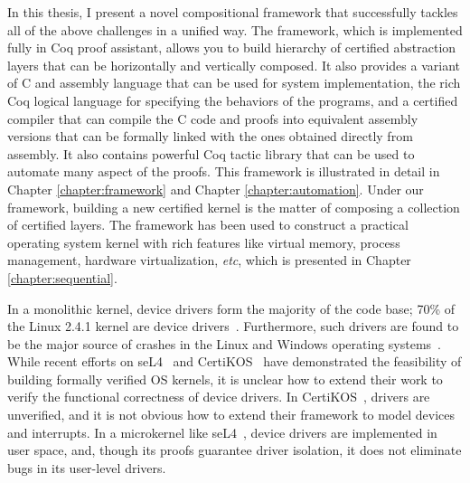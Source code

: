 In this thesis, I present a novel compositional  framework that successfully
tackles all of the above challenges in a unified way. The framework,
which is implemented fully in Coq proof assistant, allows
you to build hierarchy of certified abstraction layers that can be horizontally
and vertically composed. It also provides a variant of C and assembly language
that can be used for system implementation, the rich Coq logical language
for specifying the behaviors of the programs, and a certified compiler that can compile
the C code and proofs into equivalent assembly versions that can be formally linked
with the ones obtained directly from assembly. It also contains powerful
Coq tactic library that can be used to automate many aspect of the proofs.
This framework is illustrated in
detail in Chapter \ref{chapter:framework} and Chapter \ref{chapter:automation}.
Under our framework, building a new certified kernel is the matter of
composing a collection of certified layers. The framework has been used to
construct a practical operating system kernel with rich features like virtual
memory, process management, hardware virtualization, {\it etc}, which is
presented in Chapter \ref{chapter:sequential}.

In a monolithic kernel, device drivers
form the majority of the code base; 70\% of the Linux 2.4.1 kernel are
device drivers~\cite{Chou:2001}. Furthermore, such drivers are found
to be the major source of crashes in the Linux and Windows operating
systems~\cite{Chou:2001,Ball:2006,Ganapathi:2006}. While recent
efforts on seL4~\cite{klein14} and CertiKOS~\cite{dscal15} have
demonstrated the feasibility of building formally verified OS kernels,
it is unclear how to extend their work to verify the functional
correctness of device drivers. In CertiKOS~\cite{dscal15}, drivers are
unverified, and it is not obvious how to extend their framework to
model devices and interrupts. In a microkernel like
seL4~\cite{klein14}, device drivers are implemented in user space,
and, though its proofs guarantee driver isolation, it does not
eliminate bugs in its user-level drivers.

